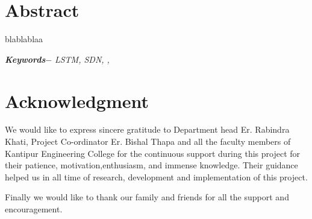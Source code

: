

\setcounter{tocdepth}{3}
\setcounter{secnumdepth}{3}


\KECcoverpage  
\KECtitlepage
{} %



\chapter*{Abstract} %
blablablaa
\par
\textbf{\textit{Keywords$-$}} \emph{LSTM, SDN,  ,}

\chapter*{Acknowledgment}
We would like to express sincere gratitude to Department head Er. Rabindra Khati, Project Co-ordinator Er. Bishal Thapa and all the faculty members of Kantipur Engineering College for the continuous support during this project for their patience, motivation,enthusiasm, and immense knowledge. Their guidance helped us in all time of research, development and implementation of this project.\par
Finally we would like to thank our family and friends for all the support and encouragement.\par
\begin{flushright}
\vskip -20pt
\submittedBy

\end{flushright}

